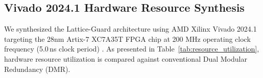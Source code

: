 \documentclass[conference]{IEEEtran}
\begin{document}
\subsection{Vivado 2024.1 Hardware Resource Synthesis}
We synthesized the Lattice-Guard architecture using AMD Xilinx Vivado 2024.1 targeting the 28nm Artix-7 XC7A35T FPGA chip at 200 MHz operating clock frequency (5.0\,ns clock period) \cite{xilinx2023artix7}. As presented in Table~\ref{tab:resource_utilization}, hardware resource utilization is compared against conventional Dual Modular Redundancy (DMR).

\begin{table}[htbp]
\caption{Vivado Synthesis Resource Utilization (200 MHz Operating Clock)}
\label{tab:resource_utilization}
\begin{center}
\end{center}
\end{table}
\end{document}
